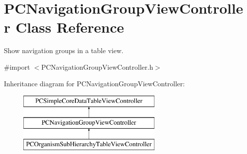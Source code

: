 \hypertarget{interface_p_c_navigation_group_view_controller}{
\section{PCNavigationGroupViewController Class Reference}
\label{interface_p_c_navigation_group_view_controller}
}


Show navigation groups in a table view.  




{\ttfamily \#import $<$PCNavigationGroupViewController.h$>$}

Inheritance diagram for PCNavigationGroupViewController:\begin{figure}[h!]
\begin{center}
\leavevmode
\includegraphics[height=3.000000cm]{kegg_doc/interface_p_c_navigation_group_view_controller}
\end{center}
\end{figure}
